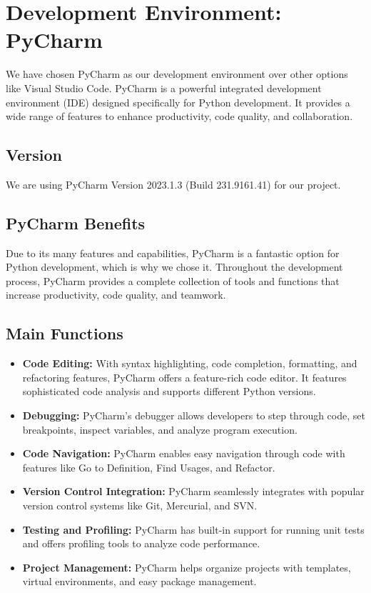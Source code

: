 %
%
%

\chapter{Development Environment: PyCharm}
\label{ch:pycharm}

We have chosen PyCharm as our development environment over other options like Visual Studio Code. PyCharm is a powerful integrated development environment (IDE) designed specifically for Python development. It provides a wide range of features to enhance productivity, code quality, and collaboration.

\section{Version}
We are using PyCharm Version 2023.1.3 (Build 231.9161.41) for our project.

\section{PyCharm Benefits}
Due to its many features and capabilities, PyCharm is a fantastic option for Python development, which is why we chose it. Throughout the development process, PyCharm provides a complete collection of tools and functions that increase productivity, code quality, and teamwork.

\section{Main Functions}
\begin{itemize}
	\item \textbf{Code Editing:} With syntax highlighting, code completion, formatting, and refactoring features, PyCharm offers a feature-rich code editor. It features sophisticated code analysis and supports different Python versions.
	\item \textbf{Debugging:} PyCharm's debugger allows developers to step through code, set breakpoints, inspect variables, and analyze program execution.
	\item \textbf{Code Navigation:} PyCharm enables easy navigation through code with features like Go to Definition, Find Usages, and Refactor.
	\item \textbf{Version Control Integration:} PyCharm seamlessly integrates with popular version control systems like Git, Mercurial, and SVN.
	\item \textbf{Testing and Profiling:} PyCharm has built-in support for running unit tests and offers profiling tools to analyze code performance.
	\item \textbf{Project Management:} PyCharm helps organize projects with templates, virtual environments, and easy package management.
\end{itemize}

